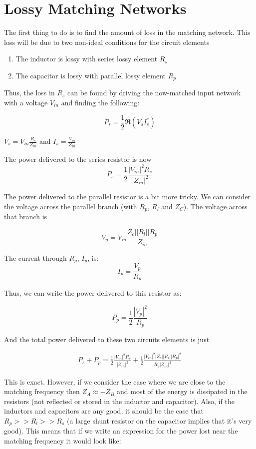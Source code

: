 \section{Lossy Matching Networks}
\addtocounter{section}{1}
\setcounter{equation}{0}

The first thing to do is to find the amount of loss in the matching network.
This loss will be due to two non-ideal conditions for the circuit elements
\begin{enumerate}
    \item The inductor is lossy with series lossy element $R_s$
    \item The capacitor is lossy with parallel lossy element $R_p$
\end{enumerate}

Thus, the loss in $R_s$ can be found by driving the now-matched input network
with a voltage $V_{in}$ and finding the following:

\[ 
        P_{s} = \frac{1}{2} \Re \left( V_{s} I_s^* \right) 
\]

$V_s = V_{in} \frac{R_s}{Z_{in}}$ and $I_s = \frac{V_{in}}{Z_{in}}$ 

The power delivered to the series resistor is now 
\[ 
    P_s = \frac{1}{2} \frac{\left|V_{in}\right|^2 R_s}{\left|Z_{in}\right|^2}
\]

The power delivered to the parallel resistor is a bit more tricky. We can
consider the voltage across the parallel branch (with $R_p$, $R_l$ and $Z_C$).
The voltage across that branch is 

\[ 
        V_p = V_{in} \frac{Z_c||R_l||R_p}{Z_{in}}
\]

The current through $R_p$, $I_p$, is:
\[ 
    I_p = \frac{V_p}{R_p} 
\]

Thus, we can write the power delivered to this resistor as:

\[ 
    P_p = \frac{1}{2}  \frac{\left|V_p \right|^2 }{R_p}
\]

And the total power delivered to these two circuits elements is just

\begin{align}
    P_s + P_p = \frac{1}{2} \frac{\left| V_{in} \right|^2 R_s}{\left| Z_{in}
    \right|^2} + \frac{1}{2} \frac{\left| V_{in} \right|^2 \Big|
Z_c||R_l||R_p \Big|^2}{R_p\left| Z_{in} \right|^2} \label{power}
\end{align}

This is exact. However, if we consider the case where we are close to the
matching frequency then $Z_A \approx - Z_B$ and most of the energy is dissipated
in the resistors (not reflected or stored in the inductor and capacitor). Also,
if the inductors and capacitors are any good, it should be the case that $ 
 R_p >> R_l >> R_s$ (a large shunt resistor on the capacitor implies that it's
 very good). This means that if we write an expression for the power
lost near the matching frequency it would look like:


